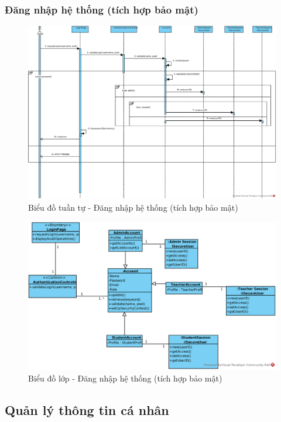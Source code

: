 \documentclass[./../main.tex]{subfiles}
\begin{document}
\subsubsection{Đăng nhập hệ thống (tích hợp bảo mật)}
\begin{figure}[H]
	\centering
	\includegraphics[width=\linewidth]{./images/UseCaseDesignDiagram/ucr_sec_login.eps}
	\caption{Biểu đồ tuần tự - Đăng nhập hệ thống (tích hợp bảo mật)}
\end{figure}
\begin{figure}[H]
	\centering
	\includegraphics[width=\linewidth]{./images/UseCaseDesignDiagram/ucd_sec_login.eps}
	\caption{Biểu đồ lớp - Đăng nhập hệ thống (tích hợp bảo mật)}
\end{figure}

\subsection{Quản lý thông tin cá nhân}
\end{document}
